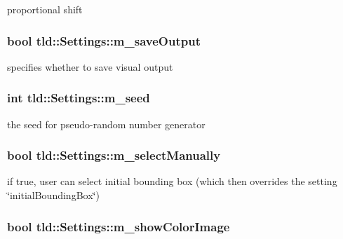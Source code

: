 proportional shift 

\hypertarget{classtld_1_1Settings_a46de5897c9f1bc410c0f44f459181e05}{
\subsubsection[{m\-\_\-save\-Output}]{\setlength{\rightskip}{0pt plus 5cm}bool tld\-::\-Settings\-::m\-\_\-save\-Output}}\label{classtld_1_1Settings_a46de5897c9f1bc410c0f44f459181e05}


specifies whether to save visual output 

\hypertarget{classtld_1_1Settings_a07dc62407c3373e7fa3906c145593b69}{
\subsubsection[{m\-\_\-seed}]{\setlength{\rightskip}{0pt plus 5cm}int tld\-::\-Settings\-::m\-\_\-seed}}\label{classtld_1_1Settings_a07dc62407c3373e7fa3906c145593b69}


the seed for pseudo-\/random number generator 

\hypertarget{classtld_1_1Settings_afadc64d205d5386d94088e87dba72519}{
\subsubsection[{m\-\_\-select\-Manually}]{\setlength{\rightskip}{0pt plus 5cm}bool tld\-::\-Settings\-::m\-\_\-select\-Manually}}\label{classtld_1_1Settings_afadc64d205d5386d94088e87dba72519}


if true, user can select initial bounding box (which then overrides the setting \char`\"{}initial\-Bounding\-Box\char`\"{}) 

\hypertarget{classtld_1_1Settings_a495b2aba7d0c9ec5fb914ab04b6d42cf}{
\subsubsection[{m\-\_\-show\-Color\-Image}]{\setlength{\rightskip}{0pt plus 5cm}bool tld\-::\-Settings\-::m\-\_\-show\-Color\-Image}}\label{classtld_1_1Settings_a495b2aba7d0c9ec5fb914ab04b6d42cf}


